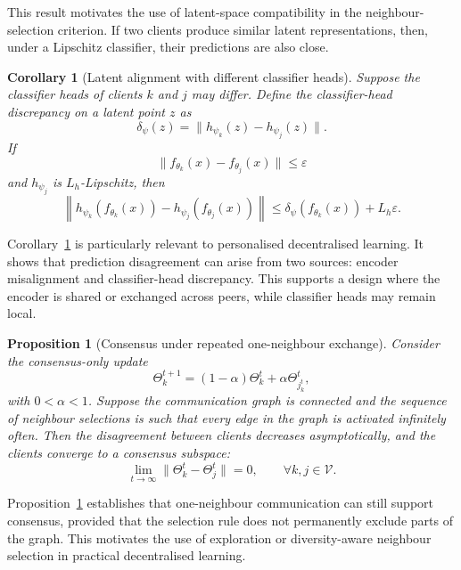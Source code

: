 \documentclass[conference]{IEEEtran}
\newtheorem{proposition}{Proposition}
\newtheorem{corollary}{Corollary}
\begin{document}
This result motivates the use of latent-space compatibility in the neighbour-selection criterion. If two clients produce similar latent representations, then, under a Lipschitz classifier, their predictions are also close.

\begin{corollary}[Latent alignment with different classifier heads]
\label{cor:different_heads}
Suppose the classifier heads of clients $k$ and $j$ may differ. Define the classifier-head discrepancy on a latent point $z$ as
\begin{equation*}
\delta_{\psi}(z)
=
\|h_{\psi_k}(z)-h_{\psi_j}(z)\|.
\end{equation*}
If
\begin{equation*}
\|f_{\theta_k}(x)-f_{\theta_j}(x)\|
\leq
\varepsilon
\end{equation*}
and $h_{\psi_j}$ is $L_h$-Lipschitz, then
\begin{equation*}
\left\|
h_{\psi_k}(f_{\theta_k}(x))
-
h_{\psi_j}(f_{\theta_j}(x))
\right\|
\leq
\delta_{\psi}(f_{\theta_k}(x))
+
L_h\varepsilon.
\end{equation*}
\end{corollary}

Corollary~\ref{cor:different_heads} is particularly relevant to personalised decentralised learning. It shows that prediction disagreement can arise from two sources: encoder misalignment and classifier-head discrepancy. This supports a design where the encoder is shared or exchanged across peers, while classifier heads may remain local.

\begin{proposition}[Consensus under repeated one-neighbour exchange]
\label{prop:consensus}
Consider the consensus-only update
\begin{equation*}
\Theta_k^{t+1}
=
(1-\alpha)\Theta_k^t
+
\alpha\Theta_{j_k^t}^t,
\end{equation*}
with $0<\alpha<1$. Suppose the communication graph is connected and the sequence of neighbour selections is such that every edge in the graph is activated infinitely often. Then the disagreement between clients decreases asymptotically, and the clients converge to a consensus subspace:
\begin{equation*}
\lim_{t\rightarrow\infty}
\|\Theta_k^t-\Theta_j^t\|
=
0,
\qquad
\forall k,j\in\mathcal{V}.
\end{equation*}
\end{proposition}

Proposition~\ref{prop:consensus} establishes that one-neighbour communication can still support consensus, provided that the selection rule does not permanently exclude parts of the graph. This motivates the use of exploration or diversity-aware neighbour selection in practical decentralised learning.
\end{document}
